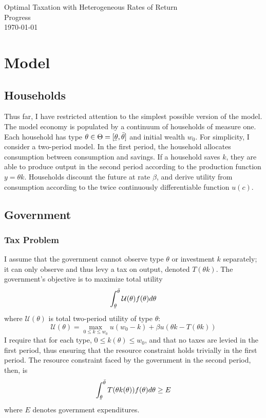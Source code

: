 \documentclass[11pt]{article}
\newcommand{\ubar}[1]{\underaccent{\bar}{#1}}
\newcommand{\U}{\mathcal{U}}
\begin{document}
    \begin{flushleft}
        Optimal Taxation with Heterogeneous Rates of Return \\
        Progress \\
        \today
    \end{flushleft}

\section{Model} \label{model_s}

\subsection{Households} \label{hhs}

Thus far, I have restricted attention to the simplest possible version of the model. The model economy is populated by a continuum of households of measure one. Each household has type \( \theta\in\Theta = [\ubar{\theta}, \bar{\theta}]\) and initial wealth \( w_0 \). For simplicity, I consider a two-period model. In the first period, the household allocates consumption between consumption and savings. If a household saves \( k \), they are able to produce output in the second period according to the production function \( y = \theta k \). Households discount the future at rate \( \beta \), and derive utility from consumption according to the twice continuously differentiable function \( u(c) \). 

\subsection{Government} \label{gov}
\subsubsection{Tax Problem} \label{tax_prob}
I assume that the government cannot observe type \( \theta \) or investment \( k \) separately; it can only observe and thus levy a tax on output, denoted \( T(\theta k) \). The government's objective is to maximize total utility
\begin{equation}
    \int_{\ubar{\theta}}^{\bar{\theta}} \U(\theta)f(\theta)d\theta \label{obj_tax}
\end{equation}
where \( \U(\theta) \) is total two-period utility of type \( \theta \):
\begin{equation}
    \U(\theta) = \max_{0\leq k \leq w_0} u(w_0 - k) + \beta u(\theta k - T(\theta k)) \label{bigu_tax}
\end{equation}
I require that for each type, \( 0 \leq k(\theta) \leq w_0 \), and that no taxes are levied in the first period, thus ensuring that the resource constraint holds trivially in the first period. The resource constraint faced by the government in the second period, then, is 
\begin{equation}
    \int_{\ubar{\theta}}^{\bar{\theta}} T(\theta k(\theta))f(\theta)d\theta \geq E \label{rc_tax}
\end{equation}
where \( E \) denotes government expenditures. 
\end{document}
